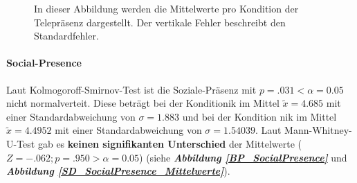 \documentclass[a4paper,11pt]{article}%
\renewcommand{\\}{\vspace*{0.5\baselineskip} \newline}
\begin{document}
\begin{figure}[H]
\begin{minipage}[t]{.5\linewidth}
      \caption[Durchschnittlich der wahrgenommenen Telepräsenz]{In dieser Abbildung werden die Mittelwerte pro Kondition der Telepräsenz dargestellt. Der vertikale Fehler beschreibt den Standardfehler.}
       \label{SD_Telepresence_Mittelwerte}
   \end{minipage}
\end{figure}


\paragraph{Social-Presence} 
Laut Kolmogoroff-Smirnov-Test ist die Soziale-Präsenz mit $p = .031 < \alpha = 0.05$ nicht normalverteit. 
Diese beträgt bei der Kondition\newline \ac{ik} im Mittel $\tilde x = 4.685$ mit einer Standardabweichung von $\sigma = 1.883$ und
bei der Kondition \ac{nik} im Mittel $\tilde x = 4.4952$ mit einer Standardabweichung von $\sigma = 1.54039$. 
Laut Mann-Whitney-U-Test gab es \textbf{keinen signifikanten Unterschied} der Mittelwerte ($ Z = -.062; p = .950 > \alpha = 0.05$) (siehe \textbf{\textit{Abbildung \ref{BP_SocialPresence}}} und \textbf{\textit{Abbildung \ref{SD_SocialPresence_Mittelwerte}}}).
	
\end{document}
